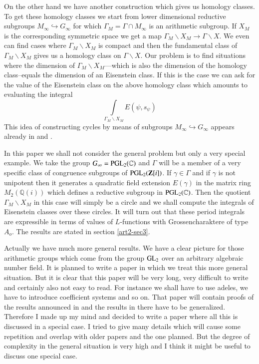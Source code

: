 On the other hand we have another construction which gives us homology classes. To get these homology classes we start from lower dimensional reductive subgroups $M_{\infty}\hookrightarrow G_{\infty}$ for which $\Gamma_{M}=\Gamma\cap M_{\infty}$ is an arithmetic subgroup. If $X_{M}$ is the corresponding symmetric space we get a map $\Gamma_{M}\backslash X_{M}\to \Gamma\backslash X$. We even can find cases where $\Gamma_{M}\backslash X_{M}$ is compact and then the fundamental class of $\Gamma_{M}\backslash X_{M}$ gives us a homology class on $\Gamma\backslash X$. Our problem is to find situations where the dimension of $\Gamma_{M}\backslash X_{M}$\pageoriginale---which is also the dimension of the homology class--equals the dimension of an Eisenstein class. If this is the case we can ask for the value of the Eisenstein class on the above homology class which amounts to evaluating the integral
$$
\int\limits_{\Gamma_{M}\backslash X_{M}}E(\psi,s_{\psi})
$$
This idea of constructing cycles by means of subgroups $M_{\infty}\hookrightarrow G_{\infty}$ appears already in \cite{art2-key2} and \cite{art2-key16}.

In this paper we shall not consider the general problem but only a very special example. We take the group $G_{\infty}=\mathrm{PGL}_{2}(\mathbb{C})$ and $\Gamma$ will be a member of a very specific class of congruence subgroups of $\mathrm{PGL}_{2}(\mathbf{Z}[i])$. If $\gamma\in \Gamma$ and if $\gamma$ is not unipotent then it generates a quadratic field extension $E(\gamma)$ in the matrix ring $M_{2}(\mathbb{Q}(i))$ which defines a reductive subgroup in $\mathrm{PGL}_{2}(\mathbb{C})$. Then the quotient $\Gamma_{M}\backslash X_{M}$ in this case will simply be a circle and we shall compute the integrals of Eisenstein classes over these circles. It will turn out that these period integrals are expressible in terms of values of $L$-functions with Grossencharaktere of type $A_{o}$. The results are stated in section \ref{art2-sec3}.

Actually we have much more general results. We have a clear picture for those arithmetic groups which come from the group $\mathrm{GL}_{2}$ over an arbitrary algebraic number field. It is planned to write a paper in which we treat this more general situation. But it is clear that this paper will be very long, very difficult to write and certainly also not easy to read. For instance we shall have to use adeles, we have to introduce coefficient systems and so on. That paper will contain proofs of the results announced in \cite{art2-key7} and the results in there have to be generalized. Therefore I made up my mind and decided to write a paper where all this is discussed in a special case. I tried to give many details which will cause some repetition and overlap with older papers and the one planned. But the degree of complexity in the general situation is very high and I think it might be useful to discuss one special case.

